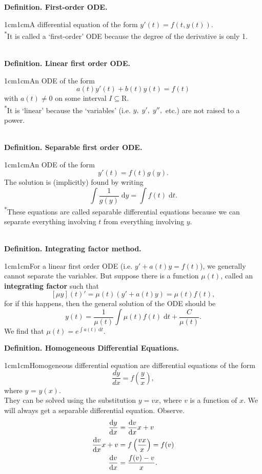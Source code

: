 \documentclass{article}
\newcommand{\definition}[2]{\textbf{Definition. #1.}\begin{adjustwidth}{1cm}{1cm}#2\end{adjustwidth}}
\begin{document}
\definition{First-order ODE}{A differential equation of the form $y'(t) = f(t, y(t)).$\\\textsuperscript{*}It is called a `first-order' ODE because the degree of the derivative is only 1.} ~\\
\definition{Linear first order ODE}{An ODE of the form \[a(t)y'(t)+b(t)y(t)=f(t)\] with $a(t) \neq 0$ on some interval $I \subseteq \mathrm{R}$.\\\textsuperscript{*}It is `linear' because the `variables' (i.e. $y, \; y', \; y'',$ etc.) are not raised to a power.} ~\\
\definition{Separable first order ODE}{An ODE of the form \[y'(t) = f(t)g(y).\]The solution is (implicitly) found by writing \[\int \frac{1}{g(y)} \; \mathrm{d}y = \int f(t) \; \mathrm{d}t.\]\textsuperscript{*}These equations are called separable differential equations because we can separate everything involving $t$ from everything involving $y$.} ~\\
\definition{Integrating factor method}{For a linear first order ODE (i.e. $y' + a(t)y = f(t)$), we generally cannot separate the variables. But suppose there is a function $\mu(t)$, called an \textbf{integrating factor} such that \[[\mu y](t)' = \mu(t)(y' + a(t)y) = \mu(t)f(t),\]for if this happens, then the general solution of the ODE should be \[y(t)=\frac{1}{\mu(t)}\int \mu(t) f(t) \; \mathrm{d}t + \frac{C}{\mu(t)}.\]We find that $\mu(t) = e^{\int a(t) \; \mathrm{d} t}.$} \newpage
\definition{Homogeneous Differential Equations}{Homogeneous differential equation are differential equations of the form \[\frac{dy}{dx}=f \left( \frac{y}{x} \right),\] where $y$ = $y(x)$.\\[1\baselineskip]They can be solved using the substitution $y=vx$, where $v$ is a function of $x$. We will always get a separable differential equation. Observe. \begin{align} \frac{\mathrm{d}y}{\mathrm{d}x} &= \frac{\mathrm{d}v}{\mathrm{d}x}x + v \notag \\ \frac{\mathrm{d}v}{\mathrm{d}x}x + v &= f\left(\frac{vx}{x}\right) = f(v) \notag \\ \frac{\mathrm{d}v}{\mathrm{d}x} &= \frac{f(v) - v}{x}. \notag \end{align}} ~\\
\end{document}
